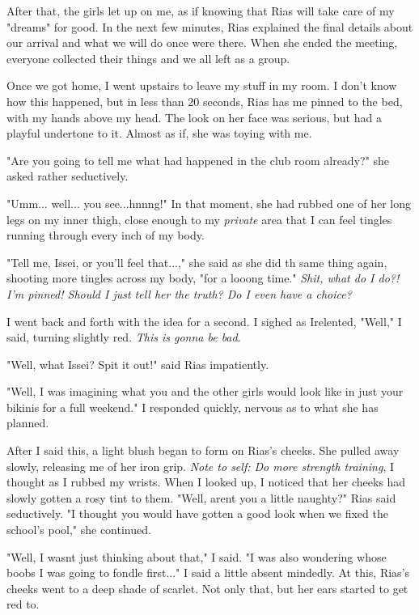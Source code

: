 \documentclass{article}
\begin{document}
After that, the girls let up on me, as if knowing that Rias will take care of my "dreams" for good. In the next few minutes, Rias explained the final details about our arrival and what we will do once were there. When she ended the meeting, everyone collected their things and we all left as a group.

Once we got home, I went upstairs to leave my stuff in my room. I don't know how this happened, but in less than 20 seconds, Rias has me pinned to the bed, with my hands above my head. The look on her face was serious, but had a playful undertone to it. Almost as if, she was toying with me.

"Are you going to tell me what had happened in the club room already?" she asked rather seductively.

"Umm... well... you see...hnnng!" In that moment, she had rubbed one of her long legs on my inner thigh, close enough to my \emph{private} area that I can feel tingles running through every inch of my body.

"Tell me, Issei, or you'll feel that...," she said as she did th same thing again, shooting more tingles across my body, "for a looong time." \emph{Shit, what do I do?! I'm pinned! Should I just tell her the truth? Do I even have a choice?}

I went back and forth with the idea for a second. I sighed as Irelented, "Well," I said, turning slightly red. \emph{This is gonna be bad}.

"Well, what Issei? Spit it out!" said Rias impatiently.

"Well, I was imagining what you and the other girls would look like in just your bikinis for a full weekend." I responded quickly, nervous as to what she has planned.

After I said this, a light blush began to form on Rias's cheeks. She pulled away slowly, releasing me of her iron grip. \emph{Note to self: Do more strength training}, I thought as I rubbed my wrists. When I looked up, I noticed that her cheeks had slowly gotten a rosy tint to them. "Well, arent you a little naughty?" Rias said seductively. "I thought you would have gotten a good look when we fixed the school's pool," she continued.

"Well, I wasnt just thinking about that," I said. "I was also wondering whose boobs I was going to fondle first..." I said a little absent mindedly. At this, Rias's cheeks went to a deep shade of scarlet. Not only that, but her ears started to get red to.
\end{document}
